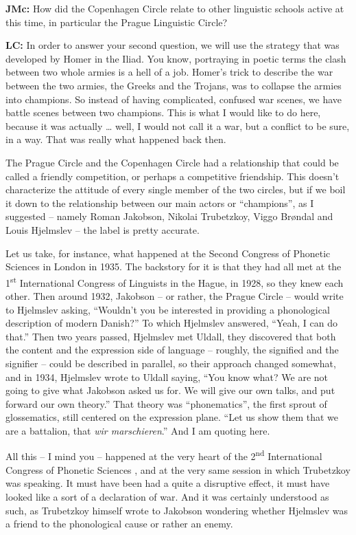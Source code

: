\textbf{JMc:} How did the Copenhagen Circle relate to other linguistic schools active at this time, in particular the Prague Linguistic Circle?

\textbf{LC:} In order to answer your second question, we will use the strategy that was developed by Homer in the Iliad. You know, portraying in poetic terms the clash between two whole armies is a hell of a job. Homer’s trick to describe the war between the two armies, the Greeks and the Trojans, was to collapse the armies into champions. So instead of having complicated, confused war scenes, we have battle scenes between two champions. This is what I would like to do here, because it was actually … well, I would not call it a war, but a conflict to be sure, in a way. That was really what happened back then. 

The Prague Circle and the Copenhagen Circle had a relationship that could be called a friendly competition, or perhaps a competitive friendship. This doesn’t characterize the attitude of every single member of the two circles, but if we boil it down to the relationship between our main actors or “champions”, as I suggested – namely Roman Jakobson, Nikolai Trubetzkoy, Viggo Brøndal and Louis Hjelmslev – the label is pretty accurate. 

Let us take, for instance, what happened at the Second Congress of Phonetic Sciences in London in 1935. The backstory for it is that they had all met at the 1\textsuperscript{st} International Congress of Linguists in the Hague, in 1928, so they knew each other. Then around 1932, Jakobson – or rather, the Prague Circle – would write to Hjelmslev asking, “Wouldn’t you be interested in providing a phonological description of modern Danish?” To which Hjelmslev answered, “Yeah, I can do that.” Then two years passed, Hjelmslev met Uldall, they discovered that both the content and the expression side of language – roughly, the signified and the signifier – could be described in parallel, so their approach changed somewhat, and in 1934, Hjelmslev wrote to Uldall saying, “You know what? We are not going to give what Jakobson asked us for. We will give our own talks, and put forward our own theory.” That theory was “phonematics”, the first sprout of glossematics, still centered on the expression plane. “Let us show them that we are a battalion, that \textit{wir marschieren}.” And I am quoting here. 

All this – I mind you – happened at the very heart of the 2\textsuperscript{nd} International Congress of Phonetic Sciences \citep{London1935}, and at the very same session in which Trubetzkoy was speaking. It must have been had a quite a disruptive effect, it must have looked like a sort of a declaration of war. And it was certainly understood as such, as Trubetzkoy himself wrote to Jakobson wondering whether Hjelmslev was a friend to the phonological cause or rather an enemy. 

